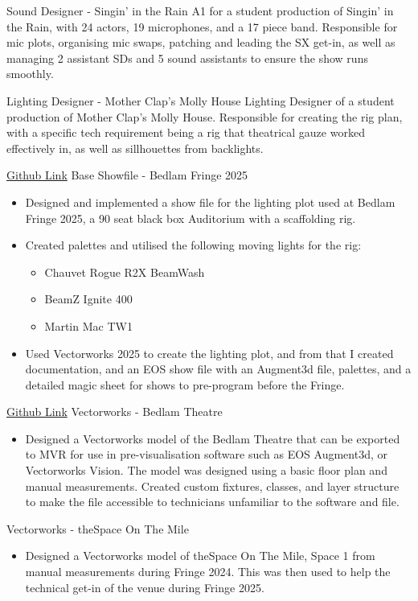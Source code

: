 \documentclass[../../cv-cs.tex]{subfiles}
\begin{document}
\cvlinkevent
{}
{Sound Designer - Singin' in the Rain}
{A1 for a student production of Singin' in the Rain, with 24 actors, 19 microphones, and a 17 piece band. Responsible for mic plots, organising mic swaps, patching and leading the SX get-in, as well as managing 2 assistant SDs and 5 sound assistants to ensure the show runs smoothly.}

\cvlinkevent
{}
{Lighting Designer - Mother Clap's Molly House}
{Lighting Designer of a student production of Mother Clap's Molly House. Responsible for creating the rig plan, with a specific tech requirement being a rig that theatrical gauze worked effectively in, as well as sillhouettes from backlights.}

\cvlinkevent
{\href{https://github.com/leon0241/Bedlam-Fringe-Showfile-25}{Github Link}}
{Base Showfile - Bedlam Fringe 2025}
{\begin{itemize}
    \item Designed and implemented a show file for the lighting plot used at Bedlam Fringe 2025, a 90 seat black box Auditorium with a scaffolding rig.
    \item Created palettes and utilised the following moving lights for the rig:
		\begin{itemize}
		    \item Chauvet Rogue R2X BeamWash
			\item BeamZ Ignite 400
			\item Martin Mac TW1
		\end{itemize}
    \item Used Vectorworks 2025 to create the lighting plot, and from that I created documentation, and an EOS show file with an Augment3d file, palettes, and a detailed magic sheet for shows to pre-program before the Fringe.
\end{itemize}}

\cvlinkevent
{\href{https://github.com/EdinburghUniversityTheatreCompany/bedlam-vwx}{Github Link}}
{Vectorworks - Bedlam Theatre}
{\begin{itemize}
    \item Designed a Vectorworks model of the Bedlam Theatre that can be exported to MVR for use in pre-visualisation software such as EOS Augment3d, or Vectorworks Vision. The model was designed using a basic floor plan and manual measurements. Created custom fixtures, classes, and layer structure to make the file accessible to technicians unfamiliar to the software and file.
\end{itemize}}

\cvlinkevent
{}
{Vectorworks - theSpace On The Mile}
{\begin{itemize}
    \item Designed a Vectorworks model of theSpace On The Mile, Space 1 from manual measurements during Fringe 2024. This was then used to help the technical get-in of the venue during Fringe 2025.
\end{itemize}}
\end{document}
